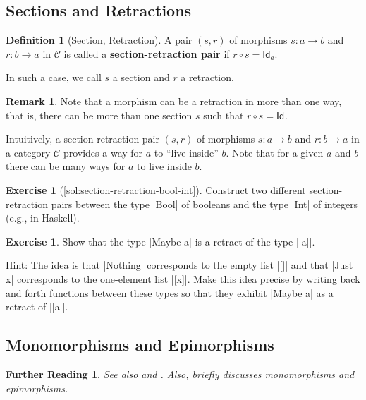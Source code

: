 \documentclass[a4paper,10pt]{scrartcl}
\theoremstyle{plain}
\newtheorem*{reading*}{Further Reading}
\theoremstyle{definition}
\newtheorem{rem}[thm]{Remark}
\newtheorem{dfn}[thm]{Definition}
\newtheorem{exer}[thm]{Exercise}
\newcommand{\cfont}[1]{\ensuremath{\mathsf{#1}}}
\newcommand{\Cat}[1]{\mathcal{#1}}
\newcommand{\CC}{\Cat{C}}
\newcommand{\Id}[1][]{\cfont{Id}_{#1}}
\newcommand{\co}[2]{\ensuremath{#2 \circ #1}}
\begin{document}
\subsection{Sections and Retractions}
\label{sec:sections}


\begin{dfn}[Section, Retraction]
  A pair $(s,r)$ of morphisms $s : a \to b$ and $r : b \to a$ in $\CC$ is called a \textbf{section-retraction pair} if $\co{s}{r} = \Id[a]$.

  In such a case, we call $s$ a section and $r$ a retraction.
\end{dfn}

\begin{rem}
  Note that a morphism can be a retraction in more than one way, that is, there can be more than one section $s$ such that $\co{s}{r} = \Id$.
\end{rem}

Intuitively, a section-retraction pair $(s,r)$ of morphisms $s : a \to b$ and $r : b \to a$ in a category $\CC$ provides a way for $a$ to ``live inside'' $b$.
Note that for a given $a$ and $b$ there can be many ways for $a$ to live inside $b$.

\begin{exer}[\cref{sol:section-retraction-bool-int}]\label{exer:section-retraction-bool-int}
  Construct two different section-retraction pairs between the type |Bool| of booleans and the type |Int| of integers (e.g., in Haskell).
\end{exer}



\begin{exer}
 Show that the type |Maybe a| is a retract of the type |[a]|. 
 
 Hint: The idea is that |Nothing| corresponds to the empty list |[]| and that |Just x| corresponds to the one-element list |[x]|. Make this idea precise by writing back and forth functions between these types so that they exhibit |Maybe a| as a retract of |[a]|. 
\end{exer}


\subsection{Monomorphisms and Epimorphisms}
\label{sec:mono-epi}

\begin{reading*}
See also \cite[p. 134]{leinster} and \cite[\S\S 2.8--2.9]{barr-wells}.
Also, \cite[\S 2.2]{pierce} briefly discusses monomorphisms and epimorphisms.
\end{reading*}
\end{document}
